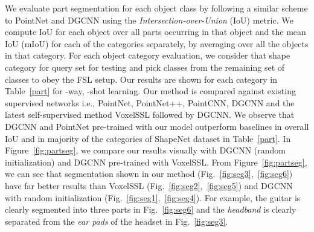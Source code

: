 \documentclass{article}
\begin{document}
We evaluate part segmentation for each object class by following a similar scheme to PointNet and DGCNN using the \emph{Intersection-over-Union} (IoU) metric. We compute IoU for each object over all parts occurring in that object and the mean IoU (mIoU) for each of the  categories separately, by averaging over all the objects in that category. For each object category evaluation, we consider that shape category for query set  for testing and pick  classes from the remaining set of classes to obey the FSL setup. Our results are shown for each category in Table~\ref{part} for -way, -shot learning. Our method is compared against existing supervised networks i.e., PointNet, PointNet++, PointCNN, DGCNN and the latest self-supervised method VoxelSSL followed by DGCNN. We observe that DGCNN and PointNet pre-trained with our model outperform baselines in overall IoU and in majority of the categories of ShapeNet dataset in Table~\ref{part}. In Figure~\ref{fig:partseg}, we compare our results visually with DGCNN (random initialization) and DGCNN pre-trained with VoxelSSL. From Figure~\ref{fig:partseg}, we can see that segmentation shown in our method (Fig.~\ref{fig:seg3},~\ref{fig:seg6}) have far better results than VoxelSSL (Fig.~\ref{fig:seg2},~\ref{fig:seg5}) and DGCNN with random initialization (Fig.~\ref{fig:seg1},~\ref{fig:seg4}). For example, the guitar is clearly segmented into three parts in Fig.~\ref{fig:seg6} and the \emph{headband} is clearly separated from the \emph{ear pads} of the headset in Fig.~\ref{fig:seg3}. 
\end{document}

